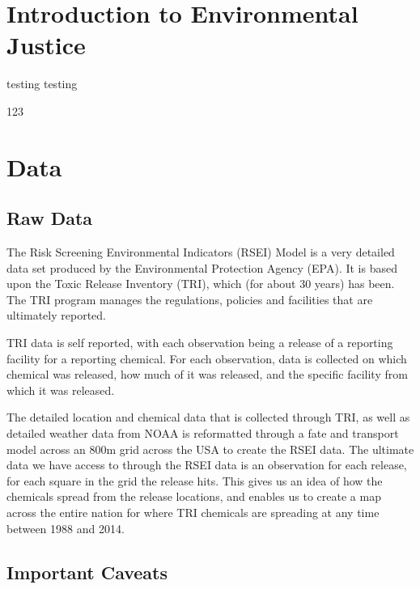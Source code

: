 \documentclass[12pt,twoside]{dukestatscithesis}
\theoremstyle{definition}
\theoremstyle{definition}
\theoremstyle{definition}
\theoremstyle{remark}
\begin{document}
\chapter{Introduction to Environmental Justice}\label{rmd-basics}

testing testing

123

\chapter{Data}\label{math}

\section{Raw Data}\label{raw-data}

The Risk Screening Environmental Indicators (RSEI) Model is a very
detailed data set produced by the Environmental Protection Agency (EPA).
It is based upon the Toxic Release Inventory (TRI), which (for about 30
years) has been. The TRI program manages the regulations, policies and
facilities that are ultimately reported.

TRI data is self reported, with each observation being a release of a
reporting facility for a reporting chemical. For each observation, data
is collected on which chemical was released, how much of it was
released, and the specific facility from which it was released.

The detailed location and chemical data that is collected through TRI,
as well as detailed weather data from NOAA is reformatted through a fate
and transport model across an 800m grid across the USA to create the
RSEI data. The ultimate data we have access to through the RSEI data is
an observation for each release, for each square in the grid the release
hits. This gives us an idea of how the chemicals spread from the release
locations, and enables us to create a map across the entire nation for
where TRI chemicals are spreading at any time between 1988 and 2014.

\section{Important Caveats}\label{important-caveats}
\end{document}
